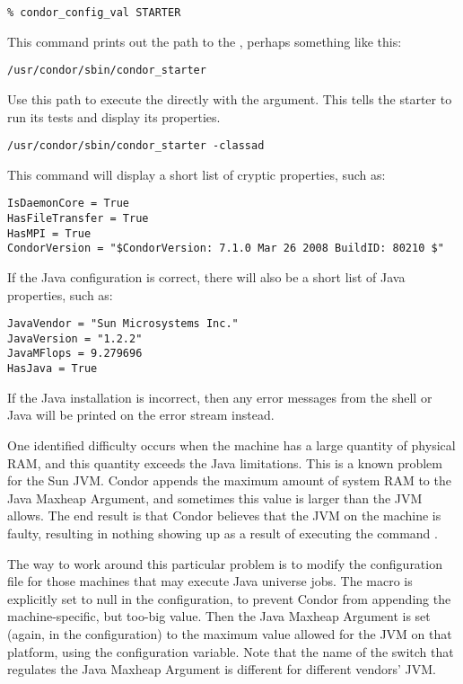 \begin{verbatim}
% condor_config_val STARTER
\end{verbatim}

This command prints out the path to the ,
perhaps something like this:

\begin{verbatim}
/usr/condor/sbin/condor_starter
\end{verbatim}

Use this path to execute the  directly
with the  argument.
This tells the starter to run its tests and display its properties.

\begin{verbatim}
/usr/condor/sbin/condor_starter -classad
\end{verbatim}

This command will display a short list of cryptic properties, such as:

\begin{verbatim}
IsDaemonCore = True
HasFileTransfer = True
HasMPI = True
CondorVersion = "$CondorVersion: 7.1.0 Mar 26 2008 BuildID: 80210 $"
\end{verbatim}

If the Java configuration is correct, there will also
be a short list of Java properties, such as:

\begin{verbatim}
JavaVendor = "Sun Microsystems Inc."
JavaVersion = "1.2.2"
JavaMFlops = 9.279696
HasJava = True
\end{verbatim}

If the Java installation is incorrect, then any error
messages from the shell or Java will be printed
on the error stream instead.

One identified difficulty occurs when the machine has
a large quantity of physical RAM, and this quantity
exceeds the Java limitations.
This is a known problem for the Sun JVM.
Condor appends the maximum amount of system RAM
to the Java Maxheap Argument,
and sometimes this value is larger than the JVM allows.
The end result is that Condor believes that the JVM on the machine
is faulty,
resulting in nothing showing up as a result of executing
the command .

The way to work around this particular problem is to modify
the configuration file for those machines that may execute
Java universe jobs.
The  macro is explicitly set
to null in the configuration, to prevent Condor from appending
the machine-specific, but too-big value.
Then the Java Maxheap Argument is set (again, in the configuration)
to the maximum value allowed for the JVM on that platform,
using the  configuration variable.
Note that the name of the switch that regulates the Java
Maxheap Argument is different for different vendors' JVM.

